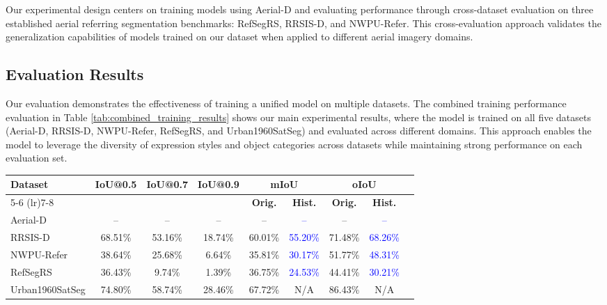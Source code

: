 Our experimental design centers on training models using Aerial-D and evaluating performance through cross-dataset evaluation on three established aerial referring segmentation benchmarks: RefSegRS, RRSIS-D, and NWPU-Refer. This cross-evaluation approach validates the generalization capabilities of models trained on our dataset when applied to different aerial imagery domains.

\subsection{Evaluation Results}
\label{subsec:evaluation_results}

Our evaluation demonstrates the effectiveness of training a unified model on multiple datasets. The combined training performance evaluation in Table \ref{tab:combined_training_results} shows our main experimental results, where the model is trained on all five datasets (Aerial-D, RRSIS-D, NWPU-Refer, RefSegRS, and Urban1960SatSeg) and evaluated across different domains. This approach enables the model to leverage the diversity of expression styles and object categories across datasets while maintaining strong performance on each evaluation set.

\begin{table*}[t]
\centering
\caption{Combined Training Performance Evaluation - Model Trained on All Dataset Train Sets (Historic-filtered results in \textcolor{blue}{blue})}
\label{tab:combined_training_results}
\begin{tabular}{@{}lcccccccc@{}}
\toprule
\textbf{Dataset} & \textbf{IoU@0.5} & \textbf{IoU@0.7} & \textbf{IoU@0.9} & \multicolumn{2}{c}{\textbf{mIoU}} & \multicolumn{2}{c}{\textbf{oIoU}} \\
\cmidrule(lr){5-6} \cmidrule(lr){7-8}
 & & & & \textbf{Orig.} & \textbf{Hist.} & \textbf{Orig.} & \textbf{Hist.} \\
\midrule
Aerial-D & -- & -- & -- & -- & \textcolor{blue}{--} & -- & \textcolor{blue}{--} \\
RRSIS-D & 68.51\% & 53.16\% & 18.74\% & 60.01\% & \textcolor{blue}{55.20\%} & 71.48\% & \textcolor{blue}{68.26\%} \\
NWPU-Refer & 38.64\% & 25.68\% & 6.64\% & 35.81\% & \textcolor{blue}{30.17\%} & 51.77\% & \textcolor{blue}{48.31\%} \\
RefSegRS & 36.43\% & 9.74\% & 1.39\% & 36.75\% & \textcolor{blue}{24.53\%} & 44.41\% & \textcolor{blue}{30.21\%} \\
Urban1960SatSeg & 74.80\% & 58.74\% & 28.46\% & 67.72\% & N/A & 86.43\% & N/A \\
\bottomrule
\end{tabular}
\end{table*}



